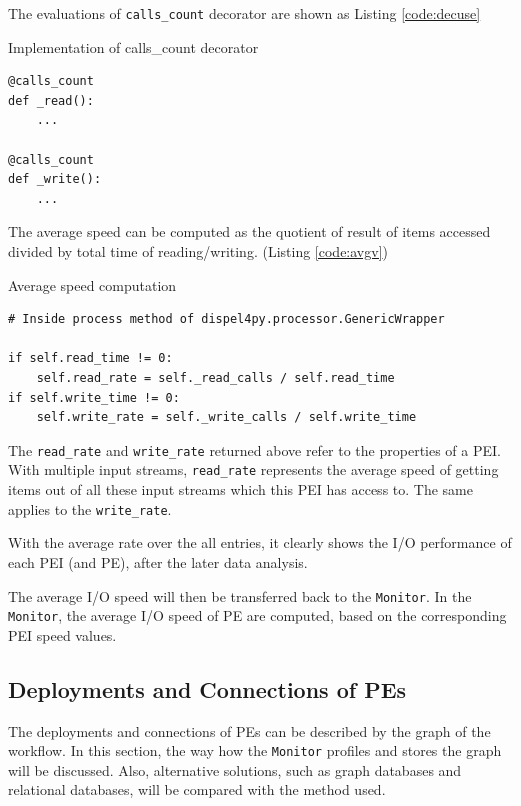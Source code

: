 \documentclass[10pt,twoside,openright,logo]{report}
\begin{document}
The evaluations of \texttt{calls_count} decorator are shown as Listing \ref{code:decuse}

\begin{listing}
\caption{Implementation of calls\_count decorator}
\label{code:decuse}
\begin{verbatim}
@calls_count
def _read():
    ...

@calls_count
def _write():
    ...
\end{verbatim}
\end{listing}

The average speed can be computed as the quotient of result of items accessed divided by total time of reading/writing. (Listing \ref{code:avgv})
\begin{listing}
\caption{Average speed computation}
\label{code:avgv}
\begin{verbatim}
# Inside process method of dispel4py.processor.GenericWrapper

if self.read_time != 0:
    self.read_rate = self._read_calls / self.read_time
if self.write_time != 0:
    self.write_rate = self._write_calls / self.write_time
\end{verbatim}
\end{listing}

The \texttt{read_rate} and \texttt{write_rate} returned above refer to the properties of a PEI. With multiple input streams, \texttt{read_rate} represents the average speed of getting items out of all these input streams which this PEI has access to. The same applies to the \texttt{write_rate}.

With the average rate over the all entries, it clearly shows the I/O performance of each PEI (and PE), after the later data analysis.

The average I/O speed will then be transferred back to the \texttt{Monitor}. In the \texttt{Monitor}, the average I/O speed of PE are computed, based on the corresponding PEI speed values.

\subsection{Deployments and Connections of PEs}
The deployments and connections of PEs can be described by the graph of the workflow. In this section, the way how the \texttt{Monitor} profiles and stores the graph will be discussed. Also, alternative solutions, such as graph databases and relational databases, will be compared with the method used.
\end{document}
